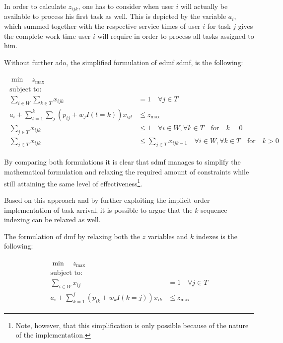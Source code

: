 In order to calculate $z_{ijk}$, one has to consider when user $i$ will actually be available to process his first task as well. This is depicted by the variable $a_i$, which summed together with the respective service times of user $i$ for task $j$ gives the complete work time user $i$ will require in order to process all tasks assigned to him.

Without further ado, the simplified formulation of \gls{edmf} \ie \gls{sdmf}, is the following:

\begin{align}
	\begin{split}
	    \min \quad z_{\text{max}}\\
	    \text{subject to:} \\
	    \sum_{i \in W} \sum_{k \in T} x_{ijk} &= 1 \quad \forall j \in T\\
	    a_i + \sum_{t=1}^k \sum_j (p_{ij} + w_j I(t=k))x_{ijt} &\leq z_{\text{max}}\\
	    \sum_{j \in T} x_{ijk} &\leq 1 \quad \forall i \in W, \forall k \in T \quad \text{for} \quad k=0\\
	    \sum_{j \in T} x_{ijk} &\leq \sum_{j \in T} x_{ijk-1} \quad \forall i \in W, \forall k \in T \quad \text{for} \quad k>0
	\end{split}
\end{align}

By comparing both formulations it is clear that \gls{sdmf} manages to simplify the mathematical formulation and relaxing the required amount of constraints while still attaining the same level of effectiveness\footnote{Note, however, that this simplification is only possible because of the nature of the implementation.}. 

Based on this approach and by further exploiting the implicit order implementation of task arrival, it is possible to argue that the $k$ sequence indexing can be relaxed as well.

The formulation of \gls{dmf} by relaxing both the $z$ variables and $k$ indexes is the following:

\begin{align}
	\begin{split}
	    \min \quad z_{\text{max}}\\
	    \text{subject to:} \\
	    \sum_{i \in W} x_{ij} &= 1 \quad \forall j \in T\\
	    a_i + \sum_{k=1}^j (p_{ik} + w_k I(k=j))x_{ik} &\leq z_{\text{max}}
	\end{split}
\end{align}

